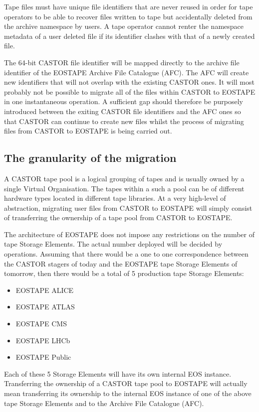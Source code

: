 \documentclass{article}
\begin{document}
Tape files must have unique file identifiers that are never reused in order for tape operators to be able to recover files written to tape but accidentally deleted from the archive namespace by users.  A tape operator cannot renter the namespace metadata of a user deleted file if its identifier clashes with that of a newly created file.

The 64-bit CASTOR file identifier will be mapped directly to the archive file identifier of the EOSTAPE Archive File Catalogue (AFC).  The AFC will create new identifiers that will not overlap with the existing CASTOR ones.  It will most probably not be possible to migrate all of the files within CASTOR to EOSTAPE in one instantaneous operation.  A sufficient gap should therefore be purposely introduced between the exiting CASTOR file identifiers and the AFC ones so that CASTOR can continue to create new files whilst the process of migrating files from CASTOR to EOSTAPE is being carried out.

\newpage
\subsection{The granularity of the migration}

A CASTOR tape pool is a logical grouping of tapes and is usually owned by a single Virtual Organisation.  The tapes within a such a pool can be of different hardware types located in different tape libraries.  At a very high-level of abstraction, migrating user files from CASTOR to EOSTAPE will simply consist of transferring the ownership of a tape pool from CASTOR to EOSTAPE.

The architecture of EOSTAPE does not impose any restrictions on the number of tape Storage Elements.  The actual number deployed will be decided by operations.  Assuming that there would be a one to one correspondence between the CASTOR stagers of today and the EOSTAPE tape Storage Elements of tomorrow, then there would be a total of 5 production tape Storage Elements:
\begin{itemize}
	\item EOSTAPE ALICE
	\item EOSTAPE ATLAS
	\item EOSTAPE CMS
	\item EOSTAPE LHCb
	\item EOSTAPE Public
\end{itemize}

Each of these 5 Storage Elements will have its own internal EOS instance.  Transferring the ownership of a CASTOR tape pool to EOSTAPE will actually mean transferring its ownership to the internal EOS instance of one of the above tape Storage Elements and to the Archive File Catalogue (AFC).
\end{document}

